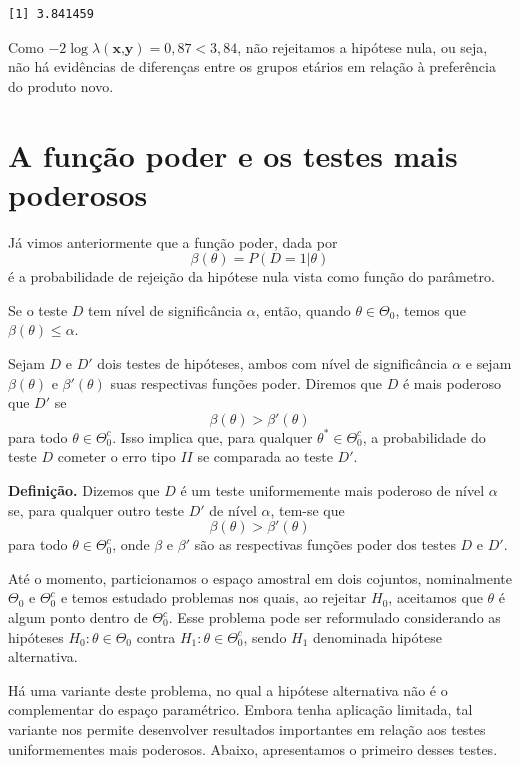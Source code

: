 \documentclass[
  letterpaper,
  DIV=11,
  numbers=noendperiod]{scrartcl}
\begin{document}
\begin{verbatim}
[1] 3.841459
\end{verbatim}

Como \(-2\log\lambda(\textbf{x,y})=0,87 <3,84\), não rejeitamos a
hipótese nula, ou seja, não há evidências de diferenças entre os grupos
etários em relação à preferência do produto novo.

\section{A função poder e os testes mais
poderosos}\label{a-funuxe7uxe3o-poder-e-os-testes-mais-poderosos}

Já vimos anteriormente que a função poder, dada por
\[\beta(\theta)=P(D=1|\theta)\] é a probabilidade de rejeição da
hipótese nula vista como função do parâmetro.

Se o teste \(D\) tem nível de significância \(\alpha\), então, quando
\(\theta\in\Theta_0\), temos que \(\beta(\theta)\leq \alpha\).

Sejam \(D\) e \(D'\) dois testes de hipóteses, ambos com nível de
significância \(\alpha\) e sejam \(\beta(\theta)\) e \(\beta'(\theta)\)
suas respectivas funções poder. Diremos que \(D\) é mais poderoso que
\(D'\) se \[\beta(\theta)>\beta'(\theta)\] para todo
\(\theta\in\Theta_0^c\). Isso implica que, para qualquer
\(\theta^*\in\Theta_0^c\), a probabilidade do teste \(D\) cometer o erro
tipo \(II\) se comparada ao teste \(D'\).

\textbf{Definição.} Dizemos que \(D\) é um teste uniformemente mais
poderoso de nível \(\alpha\) se, para qualquer outro teste \(D'\) de
nível \(\alpha\), tem-se que \[\beta(\theta)>\beta'(\theta)\] para todo
\(\theta\in\Theta_0^c\), onde \(\beta\) e \(\beta'\) são as respectivas
funções poder dos testes \(D\) e \(D'\).

Até o momento, particionamos o espaço amostral em dois cojuntos,
nominalmente \(\Theta_0\) e \(\Theta_0^c\) e temos estudado problemas
nos quais, ao rejeitar \(H_0\), aceitamos que \(\theta\) é algum ponto
dentro de \(\Theta_0^c\). Esse problema pode ser reformulado
considerando as hipóteses \(H_0:\theta\in\Theta_0\) contra
\(H_1:\theta\in\Theta_0^c\), sendo \(H_1\) denominada hipótese
alternativa.

Há uma variante deste problema, no qual a hipótese alternativa não é o
complementar do espaço paramétrico. Embora tenha aplicação limitada, tal
variante nos permite desenvolver resultados importantes em relação aos
testes uniformementes mais poderosos. Abaixo, apresentamos o primeiro
desses testes.
\end{document}
